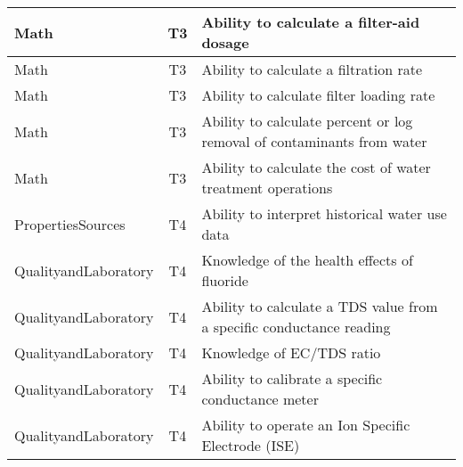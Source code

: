 \documentclass{article}
\begin{document}
\begin{table}[]
\begin{tabular}{|l|c|l|}
Math                                   & T3             & Ability to calculate   a filter-aid dosage                                                                                        \\ \hline
Math                                   & T3             & Ability to calculate   a filtration rate                                                                                          \\ \hline
Math                                   & T3             & Ability to calculate   filter loading rate                                                                                        \\ \hline
Math                                   & T3             & Ability to calculate   percent or log removal of contaminants from water                                                          \\ \hline
Math                                   & T3             & Ability to calculate   the cost of water treatment operations                                                                     \\ \hline
PropertiesSources                      & T4             & Ability to interpret   historical water use data                                                                                  \\ \hline
QualityandLaboratory                   & T4             & Knowledge of the   health effects of fluoride                                                                                     \\ \hline
QualityandLaboratory                   & T4             & Ability to calculate   a TDS value from a specific conductance reading                                                            \\ \hline
QualityandLaboratory                   & T4             & Knowledge of EC/TDS   ratio                                                                                                       \\ \hline
QualityandLaboratory                   & T4             & Ability to calibrate   a specific conductance meter                                                                               \\ \hline
QualityandLaboratory                   & T4             & Ability to operate an   Ion Specific Electrode (ISE)                                                                              \\ \hline

\end{tabular}
\end{table}
\end{document}
